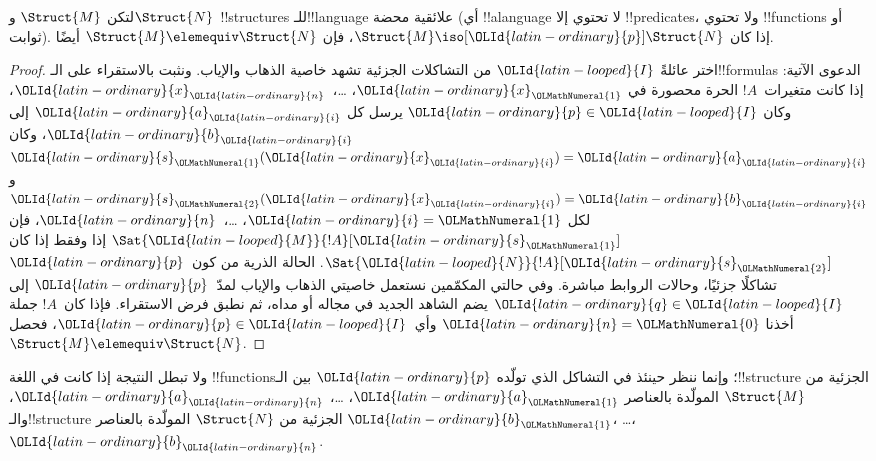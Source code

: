 \documentclass[../../../include/open-logic-section]{subfiles}
\begin{document}
\begin{thm}
  لتكن $\Struct{M}$ و$\Struct{N}$~!!{structure}s للـ!!{language} علائقية
  محضة (أي !!a{language} لا تحتوي إلا !!{predicate}s، ولا تحتوي
  !!{function}s أو ثوابت). إذا كان $\Struct{M} \iso[{\OLId{latin-ordinary}{p}}] \Struct{N}$،
  فإن $\Struct{M} \elemequiv \Struct{N}$ أيضًا.
\end{thm}

\begin{proof}
  اختر عائلةً ${\OLId{latin-looped}{I}}$ من التشاكلات الجزئية تشهد خاصية الذهاب والإياب.
  ونثبت بالاستقراء على الـ!!{formula}s الدعوى الآتية: إذا كانت
  متغيرات~$!A$ الحرة محصورة في ${\OLId{latin-ordinary}{x}}_{\OLMathNumeral{1}}$، \dots،~${\OLId{latin-ordinary}{x}}_{\OLId{latin-ordinary}{n}}$، وكان ${\OLId{latin-ordinary}{p}}\in {\OLId{latin-looped}{I}}$
  يرسل كل ${\OLId{latin-ordinary}{a}}_{\OLId{latin-ordinary}{i}}$ إلى ${\OLId{latin-ordinary}{b}}_{\OLId{latin-ordinary}{i}}$، وكان ${\OLId{latin-ordinary}{s}}_{\OLMathNumeral{1}}({\OLId{latin-ordinary}{x}}_{\OLId{latin-ordinary}{i}})={\OLId{latin-ordinary}{a}}_{\OLId{latin-ordinary}{i}}$ و${\OLId{latin-ordinary}{s}}_{\OLMathNumeral{2}}({\OLId{latin-ordinary}{x}}_{\OLId{latin-ordinary}{i}})={\OLId{latin-ordinary}{b}}_{\OLId{latin-ordinary}{i}}$
  لكل ${\OLId{latin-ordinary}{i}}={\OLMathNumeral{1}}$، \dots،~${\OLId{latin-ordinary}{n}}$، فإن $\Sat{{\OLId{latin-looped}{M}}}{!A}[{\OLId{latin-ordinary}{s}}_{\OLMathNumeral{1}}]$ إذا وفقط إذا كان
  $\Sat{{\OLId{latin-looped}{N}}}{!A}[{\OLId{latin-ordinary}{s}}_{\OLMathNumeral{2}}]$. الحالة الذرية من كون~${\OLId{latin-ordinary}{p}}$ تشاكلًا جزئيًا،
  وحالات الروابط مباشرة. وفي حالتي المكمّمين نستعمل خاصيتي الذهاب
  والإياب لمدّ~${\OLId{latin-ordinary}{p}}$ إلى ${\OLId{latin-ordinary}{q}}\in {\OLId{latin-looped}{I}}$ يضم الشاهد الجديد في مجاله أو مداه،
  ثم نطبق فرض الاستقراء. فإذا كان~$!A$ جملة أخذنا ${\OLId{latin-ordinary}{n}}={\OLMathNumeral{0}}$ وأي~${\OLId{latin-ordinary}{p}}\in {\OLId{latin-looped}{I}}$،
  فحصل $\Struct{M} \elemequiv \Struct{N}$.
\end{proof}

\begin{rem}
ولا تبطل النتيجة إذا كانت في اللغة !!{function}s؛ وإنما ننظر
حينئذ في التشاكل الذي تولّده ${\OLId{latin-ordinary}{p}}$ بين الـ!!{structure} الجزئية
من $\Struct{M}$ المولّدة بالعناصر ${\OLId{latin-ordinary}{a}}_{\OLMathNumeral{1}}$، \dots، ${\OLId{latin-ordinary}{a}}_{\OLId{latin-ordinary}{n}}$،
والـ!!{structure} الجزئية من $\Struct{N}$ المولّدة بالعناصر
${\OLId{latin-ordinary}{b}}_{\OLMathNumeral{1}}$، \dots، ${\OLId{latin-ordinary}{b}}_{\OLId{latin-ordinary}{n}}$.
\end{rem}
\end{document}
